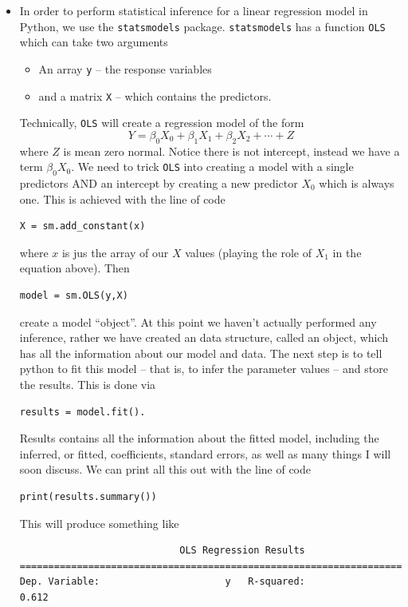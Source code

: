\begin{itemize}
\item   In order to perform statistical inference for a linear regression model in Python, we use the \verb!statsmodels! package. \verb!statsmodels! has a function \verb!OLS! which can take two arguments
\begin{itemize}
\item An array \verb!y! -- the response variables
\item and a matrix \verb!X! -- which contains the predictors. 
\end{itemize}
Technically,  \verb!OLS! will create a regression model of the form 
\begin{equation*}
Y = \beta_0 X_0 + \beta_1 X_1 + \beta_2 X_2 +\cdots + Z
\end{equation*}
where $Z$ is mean zero normal. Notice there is not intercept, instead we have a term $\beta_0 X_0$. We need to trick  \verb!OLS!
into creating a model with a single predictors AND an intercept by creating a new predictor $X_0$ which is always one. This is achieved with the line of code
\begin{Verbatim}
X = sm.add_constant(x)
\end{Verbatim}
where $x$ is jus the array of our $X$ values (playing the role of $X_1$ in the equation above). 
Then 
\begin{Verbatim}
model = sm.OLS(y,X)
\end{Verbatim}
create a model ``object''. At this point we haven't actually performed any inference, rather we have created an data structure, called an object, which has all the information about our model and data. The next step is to tell python to fit this model -- that is, to infer the parameter values -- and store the results. This is done via
\begin{Verbatim}
results = model.fit(). 
\end{Verbatim}
Results contains all the information about the fitted model, including the inferred, or fitted, coefficients, standard errors, as well as many things I will soon discuss. We can print all this out with the line of code 
\begin{Verbatim}
print(results.summary())
\end{Verbatim}
This will produce something like
\begin{Verbatim}
                            OLS Regression Results                            
==============================================================================
Dep. Variable:                      y   R-squared:                       0.612

\end{Verbatim}
\end{itemize}
